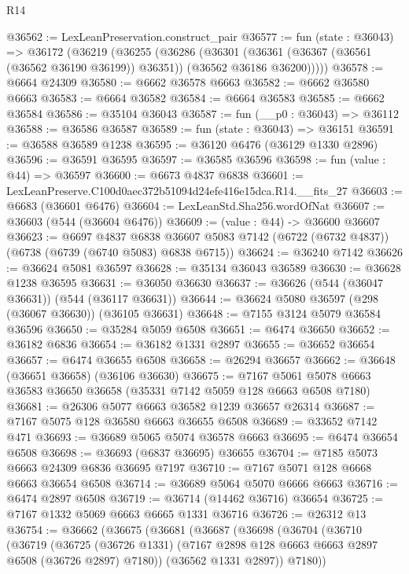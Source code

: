 \begin{lexlean}{R14}
\begin{coremodule}
@36562 := LexLeanPreservation.construct_pair
@36577 := fun (state : @36043) =>
  @36172
    (@36219
      (@36255
        (@36286
          (@36301
            (@36361 (@36367 (@36561 (@36562 @36190 @36199)) @36351))
            (@36562 @36186 @36200)))))
@36578 := @6664 @24309
@36580 := @6662 @36578 @6663
@36582 := @6662 @36580 @6663
@36583 := @6664 @36582
@36584 := @6664 @36583
@36585 := @6662 @36584
@36586 := @35104 @36043
@36587 := fun (__p0 : @36043) => @36112
@36588 := @36586 @36587
@36589 := fun (state : @36043) => @36151
@36591 := @36588 @36589 @1238
@36595 := @36120 @6476 (@36129 @1330 @2896)
@36596 := @36591 @36595
@36597 := @36585 @36596
@36598 := fun (value : @44) => @36597
@36600 := @6673 @4837 @6838
@36601 := LexLeanPreserve.C100d0aec372b51094d24efe416e15dca.R14.__fits_27
@36603 := @6683 (@36601 @6476)
@36604 := LexLeanStd.Sha256.wordOfNat
@36607 := @36603 (@544 (@36604 @6476))
@36609 := (value : @44) -> @36600 @36607
@36623 := @6697
    @4837
    @6838
    @36607
    @5083
    @7142
    (@6722 (@6732 @4837))
    (@6738 (@6739 (@6740 @5083) @6838 @6715))
@36624 := @36240 @7142
@36626 := @36624 @5081 @36597
@36628 := @35134 @36043 @36589
@36630 := @36628 @1238 @36595
@36631 := @36050 @36630
@36637 := @36626 (@544 (@36047 @36631)) (@544 (@36117 @36631))
@36644 := @36624 @5080 @36597 (@298 (@36067 @36630)) (@36105 @36631)
@36648 := @7155 @3124 @5079 @36584 @36596
@36650 := @35284 @5059 @6508
@36651 := @6474 @36650
@36652 := @36182 @6836
@36654 := @36182 @1331 @2897
@36655 := @36652 @36654
@36657 := @6474 @36655 @6508
@36658 := @26294 @36657
@36662 := @36648 (@36651 @36658) (@36106 @36630)
@36675 := @7167 @5061 @5078 @6663 @36583 @36650 @36658 (@35331 @7142 @5059 @128 @6663 @6508 @7180)
@36681 := @26306 @5077 @6663 @36582 @1239 @36657 @26314
@36687 := @7167 @5075 @128 @36580 @6663 @36655 @6508
@36689 := @33652 @7142 @471
@36693 := @36689 @5065 @5074 @36578 @6663
@36695 := @6474 @36654 @6508
@36698 := @36693 (@6837 @36695) @36655
@36704 := @7185 @5073 @6663 @24309 @6836 @36695 @7197
@36710 := @7167 @5071 @128 @6668 @6663 @36654 @6508
@36714 := @36689 @5064 @5070 @6666 @6663
@36716 := @6474 @2897 @6508
@36719 := @36714 (@14462 @36716) @36654
@36725 := @7167 @1332 @5069 @6663 @6665 @1331 @36716
@36726 := @26312 @13
@36754 := @36662
    (@36675
      (@36681
        (@36687
          (@36698
            (@36704
              (@36710
                (@36719
                  (@36725
                    (@36726 @1331)
                    (@7167 @2898 @128 @6663 @6663 @2897 @6508 (@36726 @2897) @7180))
                  (@36562 @1331 @2897))
                @7180))

\end{coremodule}
\end{lexlean}
